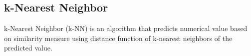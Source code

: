 
	\subsection{k-Nearest Neighbor} %
	\label{sub:k_nearest_neighbor}
	k-Nearest Neighbor (\ac{k-NN}) is an algorithm that predicts numerical value based on similarity measure using distance function of k-nearest neighbors of the predicted value.


